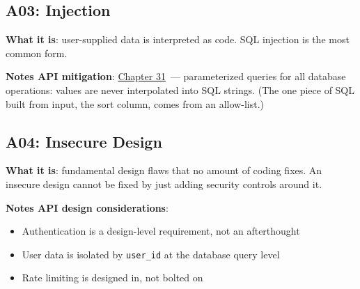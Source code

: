 \subsection*{A03: Injection}\label{38-security:a03-injection}

\textbf{What it is}: user-supplied data is interpreted as code. SQL injection is the most common form.

\textbf{Notes API mitigation}: \hyperref[ch:31-input-handling]{Chapter 31}~--- parameterized queries for all database operations: values are never interpolated into SQL strings. (The one piece of SQL built from input, the sort column, comes from an allow-list.)

\begin{codebox}[short]

\begin{Shaded}
\begin{Highlighting}[]
\SpecialCharTok{\{}\SpecialCharTok{\}}\NormalTok{)}

\end{Highlighting}
\end{Shaded}

\end{codebox}

\subsection*{A04: Insecure Design}\label{38-security:a04-insecure-design}

\textbf{What it is}: fundamental design flaws that no amount of coding fixes. An insecure design cannot be fixed by just adding security controls around it.

\textbf{Notes API design considerations}:

\begin{itemize}
\tightlist
\item
  Authentication is a design-level requirement, not an afterthought
\item
  User data is isolated by \texttt{user\_id} at the database query level
\item
  Rate limiting is designed in, not bolted on
\end{itemize}

